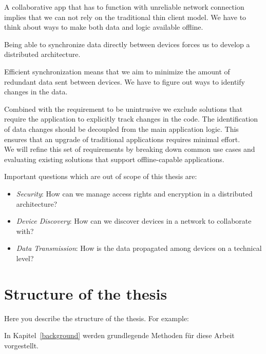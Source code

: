A collaborative app that has to function with unreliable network connection implies that we can not rely on the traditional thin client model. We have to think about ways to make both data and logic available offline.

Being able to synchronize data directly between devices forces us to develop a distributed architecture.

Efficient synchronization means that we aim to minimize the amount of redundant data sent between devices. We have to figure out ways to identify changes in the data.

Combined with the requirement to be unintrusive we exclude solutions that require the application to explicitly track changes in the code. The identification of data changes should be decoupled from the main application logic. This ensures that an upgrade of traditional applications requires minimal effort.\\

We will refine this set of requirements by breaking down common use cases and evaluating existing solutions that support offline-capable applications.

Important questions which are out of scope of this thesis are:

\begin{itemize}
\item \emph{Security}: How can we manage access rights and encryption in a distributed architecture?
\item \emph{Device Discovery}: How can we discover devices in a network to collaborate with?
\item \emph{Data Transmission}: How is the data propagated among devices on a technical level?
\end{itemize}

\section{Structure of the thesis}
Here you describe the structure of the thesis. For example:

In Kapitel~\ref{background} werden grundlegende Methoden für diese Arbeit vorgestellt.